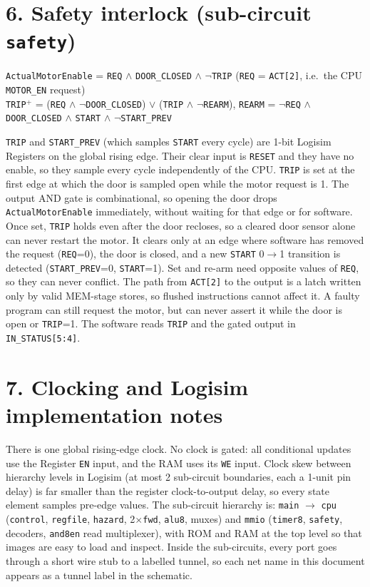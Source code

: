 \documentclass[10pt,a4paper]{article}
\begin{document}
\section*{6. Safety interlock (sub-circuit \texttt{safety})}
\begin{center}\small
\texttt{ActualMotorEnable} = \texttt{REQ} $\wedge$ \texttt{DOOR\_CLOSED} $\wedge$ $\lnot$\texttt{TRIP}\qquad
(\texttt{REQ} = \texttt{ACT[2]}, i.e.\ the CPU \texttt{MOTOR\_EN} request)\\
\texttt{TRIP}$^+$ = (\texttt{REQ} $\wedge$ $\lnot$\texttt{DOOR\_CLOSED}) $\vee$ (\texttt{TRIP} $\wedge$ $\lnot$\texttt{REARM}),\quad
\texttt{REARM} = $\lnot$\texttt{REQ} $\wedge$ \texttt{DOOR\_CLOSED} $\wedge$ \texttt{START} $\wedge$ $\lnot$\texttt{START\_PREV}
\end{center}
\texttt{TRIP} and \texttt{START\_PREV} (which samples \texttt{START} every cycle) are 1-bit Logisim Registers on the global
rising edge. Their clear input is \texttt{RESET} and they have no enable, so they sample every cycle independently of the CPU.
\texttt{TRIP} is set at the first edge at which the door is sampled open while the motor request is 1. The output AND gate is
combinational, so opening the door drops \texttt{ActualMotorEnable} immediately, without waiting for that edge or for software. Once
set, \texttt{TRIP} holds even after the door recloses, so a cleared door sensor alone can never restart the motor. It clears
only at an edge where software has removed the request (\texttt{REQ}=0), the door is closed, and a new
\texttt{START} 0$\rightarrow$1 transition is detected (\texttt{START\_PREV}=0, \texttt{START}=1). Set and re-arm need opposite
values of \texttt{REQ}, so they can never conflict. The path from \texttt{ACT[2]} to the output is a latch written only by
valid MEM-stage stores, so flushed instructions cannot affect it. A faulty program can still request the motor, but can never
assert it while the door is open or \texttt{TRIP}=1. The software reads \texttt{TRIP} and the gated output in
\texttt{IN\_STATUS[5:4]}.

\section*{7. Clocking and Logisim implementation notes}
There is one global rising-edge clock. No clock is gated: all conditional updates use the Register \texttt{EN} input, and the RAM
uses its \texttt{WE} input. Clock skew between hierarchy levels in Logisim (at most 2 sub-circuit boundaries, each a 1-unit pin delay) is
far smaller than the register clock-to-output delay, so every state element samples pre-edge values. The sub-circuit hierarchy
is: \texttt{main} $\rightarrow$ \texttt{cpu} (\texttt{control}, \texttt{regfile}, \texttt{hazard}, 2$\times$\texttt{fwd},
\texttt{alu8}, muxes) and \texttt{mmio} (\texttt{timer8}, \texttt{safety}, decoders, \texttt{and8en} read multiplexer), with ROM
and RAM at the top level so that images are easy to load and inspect. Inside the sub-circuits, every port goes through a short wire
stub to a labelled tunnel, so each net name in this document appears as a tunnel label in the schematic.
\end{document}
